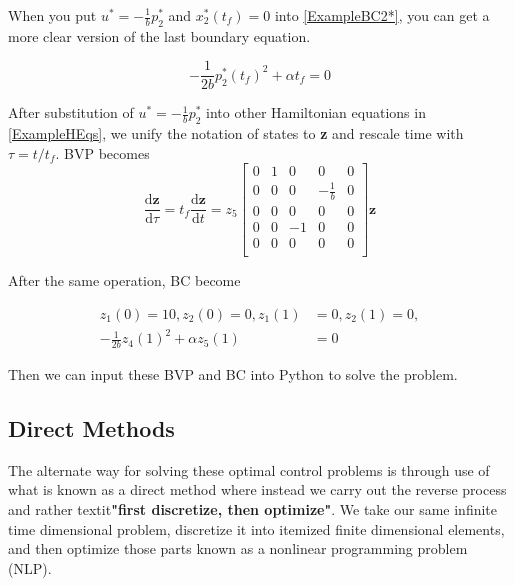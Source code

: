 \documentclass[twoside]{article}
\begin{document}
When you put $u^* = -\frac{1}{b}p_2^*$ and $x_2^*(t_f) = 0$ into \eqref{ExampleBC2*}, you can get a more clear version of the last boundary equation.

\begin{equation}\label{ExampleBC2*Clear}
-\frac{1}{2b}p_2^*(t_f)^2 + \alpha t_f = 0
\end{equation}

After substitution of $u^* = -\frac{1}{b}p_2^*$ into other Hamiltonian equations in \eqref{ExampleHEqs}, we unify the notation of states to \textbf{z} and rescale time with $\tau = t/t_f$. BVP becomes
\begin{equation}\label{FinalBVP}
\frac{\mathrm{d}\textbf{z}}{\mathrm{d}\tau} = t_f\frac{\mathrm{d}\textbf{z}}{\mathrm{d}t}
= z_5\begin{bmatrix}
    0 & 1 & 0  & 0                & 0 \\
    0 & 0 & 0  & -\frac{1}{b} & 0 \\
    0 & 0 & 0  & 0                & 0 \\
    0 & 0 & -1 & 0                & 0 \\
    0 & 0 & 0  & 0                & 0 \\
\end{bmatrix} \textbf{z}
\end{equation}

After the same operation, BC become

\begin{equation}\label{FinalBC}
\begin{split}
z_1(0) = 10, z_2(0) = 0, z_1(1) &= 0, z_2(1) = 0, \\
-\frac{1}{2b}z_4(1)^2 + \alpha z_5(1) &= 0
\end{split}
\end{equation}

Then we can input these BVP and BC into Python to solve the problem.


\subsection{Direct Methods}
The alternate way for solving these optimal control problems is through use of what is known as a direct method where instead we carry out the reverse process and rather textit{\textbf{"first discretize, then optimize"}}. We take our same infinite time dimensional problem, discretize it into itemized finite dimensional elements, and then optimize those parts known as a nonlinear programming problem (NLP).
\end{document}
